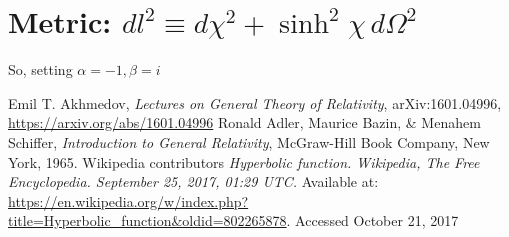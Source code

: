 \documentclass[]{article}
\begin{document}
\section{Metric: $dl^2\equiv d\chi^2+\sinh^2 \chi\,d\Omega^2$} \label{section:metric4}

So, setting $\alpha=-1,\beta=i$
\begin{thebibliography}{9}\label{section:biblio}
	\raggedright
	Emil T. Akhmedov,
	\emph{Lectures on General Theory of Relativity},
	arXiv:1601.04996,
	\url{https://arxiv.org/abs/1601.04996}
	Ronald Adler, Maurice Bazin, \& Menahem Schiffer,
	\emph{Introduction to General Relativity},
	McGraw-Hill Book Company, New York,
	1965.
	Wikipedia contributors
	\emph{Hyperbolic function. Wikipedia, The Free Encyclopedia. September 25, 2017, 01:29 UTC.}
	 Available at: 
	 \url{https://en.wikipedia.org/w/index.php?title=Hyperbolic_function&oldid=802265878}. Accessed October 21, 2017
\end{thebibliography}
\end{document}
